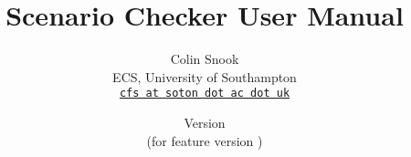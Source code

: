 \documentclass[a4paper,10pt]{article}
\title{Scenario Checker User Manual}
\author{%
  Colin Snook\\%
  ECS, University of Southampton\\%
  \texttt{\href{mailto:cfs@soton.ac.uk}{cfs at soton dot ac dot uk}}%
}%
\date{%
  Version \SCManualVersion\\%
  (for feature version \SCFeatureVersion)\\
  \ifplastex
  \SCManualDate
  \else
  \displaydate{SCManualDate}%
  \fi
}
\begin{document}
\ifplastex%
\maketitle%
\else%
 \ifstandalone%
 \maketitle %
 \else%
 \fi%
\fi%











%


\end{document}
